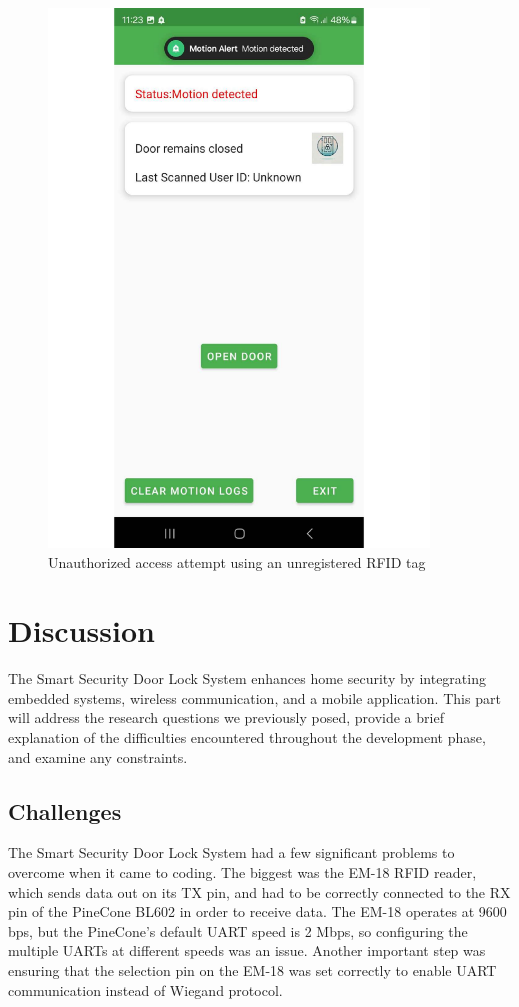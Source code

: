 \documentclass[a4paper]{scrartcl}
\begin{document}
\begin{figure}[h]
\begin{minipage}{0.45\textwidth}
        \includegraphics[width=0.9\textwidth]{unknown.pdf}
        \caption{Unauthorized access attempt using an unregistered RFID tag}
        \label{fig:unknown}
    \end{minipage}
\end{figure}





\section{Discussion}
\label{sec:discussion} 
The Smart Security Door Lock System enhances home security by integrating embedded systems, wireless communication, and a mobile application. This part will address the research
questions we previously posed, provide a brief explanation of the difficulties encountered
throughout the development phase, and examine any constraints.

\subsection{Challenges}
The Smart Security Door Lock System had a few significant problems to overcome when it came to coding. The biggest was the EM-18 RFID reader, which sends data out on its TX pin, and had to be correctly connected to the RX pin of the PineCone BL602 in order to receive data. The EM-18 operates at 9600 bps, but the PineCone's default UART speed is 2 Mbps, so configuring the multiple UARTs at different speeds was an issue. Another important step was ensuring that the selection pin on the EM-18 was set correctly to enable UART communication instead of Wiegand protocol.
\end{document}
